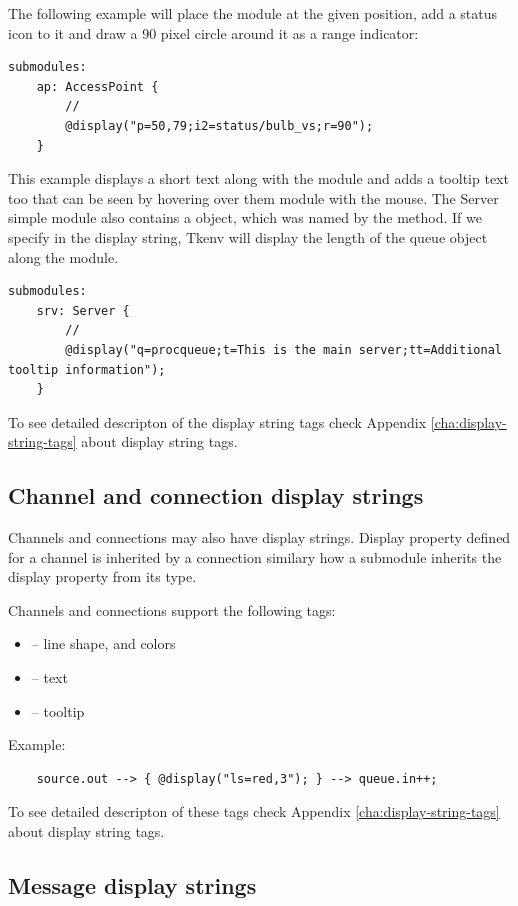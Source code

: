 The following example will place the module at the given position, 
add a status icon to it and draw a 90 pixel circle around it 
as a range indicator:
\begin{verbatim}
submodules:
    ap: AccessPoint {
        // 
        @display("p=50,79;i2=status/bulb_vs;r=90"); 
    }
\end{verbatim}

This example displays a short text along with the module and adds a tooltip text too
that can be seen by hovering over them module with the mouse. The Server simple module 
also contains a  object, which was named by the 
method. If we specify  in the display string, Tkenv will display the length
of the queue object along the module.
\begin{verbatim}
submodules:
    srv: Server {
        // 
        @display("q=procqueue;t=This is the main server;tt=Additional tooltip information"); 
    }
\end{verbatim}

To see detailed descripton of the display string tags check
Appendix \ref{cha:display-string-tags} about display string tags.

\subsection{Channel and connection display strings}

Channels and connections may also have display strings. Display property
defined for a channel is inherited by a connection similary how a submodule
inherits the display property from its type.

Channels and connections support the following tags:
\begin{itemize}
  \item{ -- line shape, and colors}
  \item{ -- text}
  \item{ -- tooltip}
\end{itemize}

Example:
\begin{verbatim}
    source.out --> { @display("ls=red,3"); } --> queue.in++;
\end{verbatim}

To see detailed descripton of these tags check
Appendix \ref{cha:display-string-tags} about display string tags.

\subsection{Message display strings}

